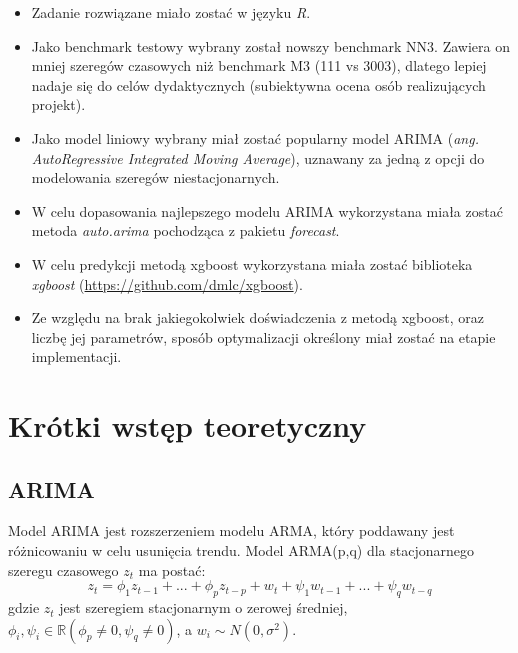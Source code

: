 \documentclass[11pt]{report}
\begin{document}
\begin{itemize}
\item Zadanie rozwiązane miało zostać w języku \textit{R}.

\item Jako benchmark testowy wybrany został nowszy benchmark NN3.
Zawiera on mniej szeregów czasowych niż benchmark M3 (111 vs 3003), dlatego lepiej nadaje się do celów dydaktycznych (subiektywna ocena osób realizujących projekt).

\item Jako model liniowy wybrany miał zostać popularny model ARIMA (\textit{ang. AutoRegressive Integrated Moving Average}), uznawany za jedną z opcji do modelowania szeregów niestacjonarnych.

\item W celu dopasowania najlepszego modelu ARIMA wykorzystana miała zostać metoda \textit{auto.arima} pochodząca z pakietu \textit{forecast}.

\item W celu predykcji metodą xgboost wykorzystana miała zostać biblioteka \textit{xgboost} (\url{https://github.com/dmlc/xgboost}).

\item Ze względu na brak jakiegokolwiek doświadczenia z metodą xgboost, oraz liczbę jej parametrów, sposób optymalizacji określony miał zostać na etapie implementacji.
\end{itemize}

\section{Krótki wstęp teoretyczny}

\subsection{ARIMA}
Model ARIMA jest rozszerzeniem modelu ARMA, który poddawany jest różnicowaniu w celu usunięcia trendu.
Model ARMA(p,q) dla stacjonarnego szeregu czasowego $z_t$ ma postać:
\begin{equation}
    z_t = \phi_1 z_{t-1} + ... + \phi_p z_{t-p} + w_t + \psi_1 w_{t-1} + ... + \psi_q w_{t-q}
\end{equation}
gdzie $z_t$ jest szeregiem stacjonarnym o zerowej średniej, $\phi_i,\psi_i \in \mathbb{R} (\phi_p \neq 0, \psi_q \neq 0)$, a $w_i \sim N(0, \sigma^2)$.
\end{document}
